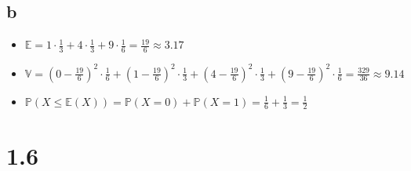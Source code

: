 \documentclass{article}
\begin{document}
        \subsection*{b}
        \begin{itemize}
            \item{$\mathbb E = 1\cdot\frac{1}{3}+4\cdot\frac{1}{3}+9\cdot\frac{1}{6}=\frac{19}{6}\approx 3.17$}
            \item{$\mathbb V = 
            (0-\frac{19}{6})^2\cdot\frac{1}{6}+(1-\frac{19}{6})^2\cdot\frac{1}{3}+
            (4-\frac{19}{6})^2\cdot\frac{1}{3}+(9-\frac{19}{6})^2\cdot\frac{1}{6}=\frac{329}{36}\approx 9.14$}
            \item{$\mathbb P(X\leq\mathbb E(X))=\mathbb P(X=0)+\mathbb P(X=1)=\frac{1}{6}+\frac{1}{3}=\frac{1}{2}$}
        \end{itemize}
    \section*{1.6}
\end{document}
